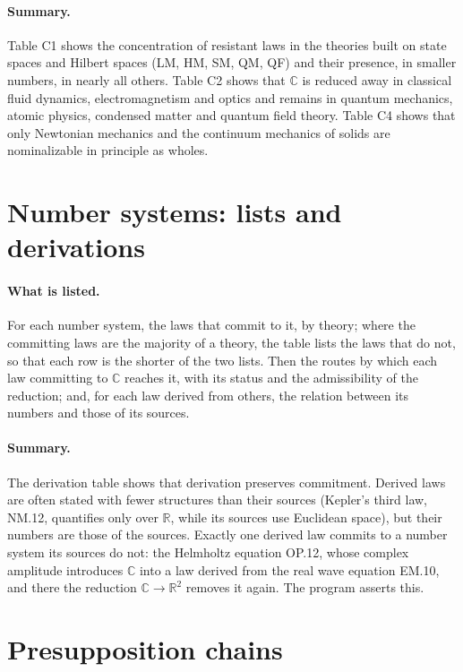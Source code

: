 \documentclass{situationist-preprint}
\begin{document}
\paragraph{Summary.} Table C1 shows the concentration of resistant laws in the theories built on state spaces and Hilbert spaces (LM, HM, SM, QM, QF) and their presence, in smaller numbers, in nearly all others. Table C2 shows that $\mathbb C$ is reduced away in classical fluid dynamics, electromagnetism and optics and remains in quantum mechanics, atomic physics, condensed matter and quantum field theory. Table C4 shows that only Newtonian mechanics and the continuum mechanics of solids are nominalizable in principle as wholes.



\section{Number systems: lists and derivations}\label{app:d}

\paragraph{What is listed.} For each number system, the laws that commit to it, by theory; where the committing laws are the majority of a theory, the table lists the laws that do not, so that each row is the shorter of the two lists. Then the routes by which each law committing to $\mathbb C$ reaches it, with its status and the admissibility of the reduction; and, for each law derived from others, the relation between its numbers and those of its sources.

\paragraph{Summary.} The derivation table shows that derivation preserves commitment. Derived laws are often stated with fewer structures than their sources (Kepler's third law, NM.12, quantifies only over $\mathbb R$, while its sources use Euclidean space), but their numbers are those of the sources. Exactly one derived law commits to a number system its sources do not: the Helmholtz equation OP.12, whose complex amplitude introduces $\mathbb C$ into a law derived from the real wave equation EM.10, and there the reduction $\mathbb C\to\mathbb R^2$ removes it again. The program asserts this.



\section{Presupposition chains}\label{app:e}
\end{document}
